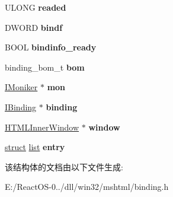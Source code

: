 \begin{DoxyCompactItemize}
U\+L\+O\+NG {\bfseries readed}
\item 
\mbox{\label{struct_b_s_callback_a04a8f0b594ae281a30b60c6a7ca9072b}} 
D\+W\+O\+RD {\bfseries bindf}
\item 
\mbox{\label{struct_b_s_callback_acc1566afe183dea2822d1021b1906cad}} 
B\+O\+OL {\bfseries bindinfo\+\_\+ready}
\item 
\mbox{\label{struct_b_s_callback_aea968131cd552a3996042062c70f4e35}} 
binding\+\_\+bom\+\_\+t {\bfseries bom}
\item 
\mbox{\label{struct_b_s_callback_abc9a66959501e9a64b7366ebe668384c}} 
\hyperlink{interface_i_moniker}{I\+Moniker} $\ast$ {\bfseries mon}
\item 
\mbox{\label{struct_b_s_callback_a40f0b925d781c3c5870676183082cf72}} 
\hyperlink{interface_i_binding}{I\+Binding} $\ast$ {\bfseries binding}
\item 
\mbox{\label{struct_b_s_callback_a9f9d59cde65e80cb0c412bc0a3d49a9e}} 
\hyperlink{struct_h_t_m_l_inner_window}{H\+T\+M\+L\+Inner\+Window} $\ast$ {\bfseries window}
\item 
\mbox{\label{struct_b_s_callback_a13bf0ffa03ce1ff468d3da966c64beb4}} 
\hyperlink{interfacestruct}{struct} \hyperlink{classlist}{list} {\bfseries entry}
\end{DoxyCompactItemize}


该结构体的文档由以下文件生成\+:\begin{DoxyCompactItemize}
\item 
E\+:/\+React\+O\+S-\/0../dll/win32/mshtml/binding.\+h\end{DoxyCompactItemize}
